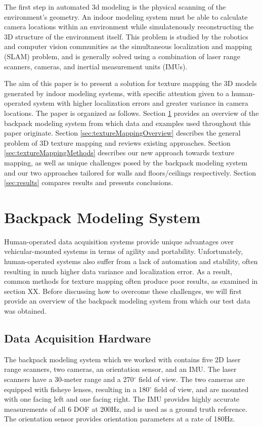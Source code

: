\documentclass[10pt,twocolumn,letterpaper]{article}
\begin{document}
The first step in automated 3d modeling is the physical scanning of
the environment's geometry. An indoor modeling system must be able to
calculate camera locations within an environment while simulatenously
reconstructing the 3D structure of the environment itself. This
problem is studied by the robotics and computer vision communities as
the simultaneous localization and mapping (SLAM) problem, and is
generally solved using a combination of laser range scanners, cameras,
and inertial measurement units (IMUs).

The aim of this paper is to present a solution for texture mapping the
3D models generated by indoor modeling systems, with specific
attention given to a human-operated system with higher localization
errors and greater variance in camera locations. The paper is
organized as follows. Section \ref{sec:backpackSystem} provides an
overview of the backpack modeling system from which data and examples
used throughout this paper originate. Section
\ref{sec:textureMappingOverview} describes the general problem of 3D
texture mapping and reviews existing approaches. Section
\ref{sec:textureMappingMethods} describes our new approach towards texture mapping, as well as unique challenges posed by the
backpack modeling system and our two approaches tailored for
walls and floors/ceilings respectively. Section \ref{sec:results}
compares results and presents conclusions.

\section{Backpack Modeling System}
\label{sec:backpackSystem}
Human-operated data acquisition systems provide unique advantages over
vehicular-mounted systems in terms of agility and
portability. Unfortunately, human-operated systems also suffer from a
lack of automation and stability, often resulting in much higher data
variance and localization error. As a result, common methods for
texture mapping often produce poor results, as examined in section
XX. Before discussing how to overcome these challenges, we will first
provide an overview of the backpack modeling system from which our
test data was obtained.

\subsection{Data Acquisition Hardware}
\label{sec:backpackHardware}
The backpack modeling system which we worked with contains five 2D
laser range scanners, two cameras, an orientation sensor, and an
IMU. The laser scanners have a 30-meter range and a 270$^{\circ}$
field of view. The two cameras are equipped with fisheye lenses,
resulting in a 180$^{\circ}$ field of view, and are mounted with one
facing left and one facing right. The IMU provides highly accurate
measurements of all 6 DOF at 200Hz, and is used as a ground truth
reference. The orientation sensor provides orientation parameters at a
rate of 180Hz.
\end{document}
